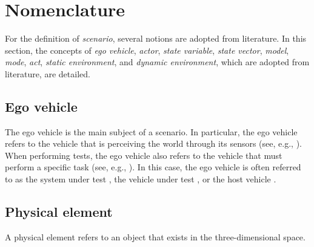 \section{Nomenclature}
\label{sec:nomenclature}

For the definition of \emph{scenario}, several notions are adopted from literature. 
In this section, the concepts of \emph{ego vehicle}, \emph{actor}, \emph{state variable}, \emph{state vector}, \emph{model}, \emph{mode}, \emph{act}, \emph{static environment}, and \emph{dynamic environment}, \cstartb which are adopted from literature\cendb, are detailed. 



\subsection{Ego vehicle}
\label{sec:ego vehicle}

The ego vehicle is the main subject of a scenario. In particular, the ego vehicle refers to the vehicle that is perceiving the world through its sensors (see, e.g., \autocite{Bonnin2014}). When performing tests, the ego vehicle also refers to the vehicle that must perform a specific task (see, e.g., \autocite{althoff2017CommonRoad, catapult2018musicc}). In this case, the ego vehicle is often referred to as the system under test \autocite{stellet2015taxonomy}, the vehicle under test \autocite{gietelink2006development}, or the host vehicle \autocite{gietelink2006development}.



\cstarte
\subsection{Physical element}
\label{sec:physical element}


A physical element refers to an object that exists in the three-dimensional space.
\cende


%
%
%
%
%



